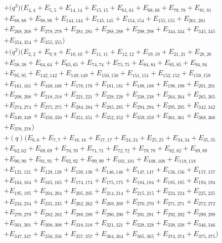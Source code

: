\documentclass[10pt,a4paper]{amsart}
\numberwithin{equation}{section}
\theoremstyle{definition}
\begin{document}
\begin{align*}
&+\bigl(q^3\bigr)(E_{4,4}+E_{5,5}+E_{14,14}+E_{15,15}+E_{61,61}+E_{68,68}+E_{78,78}+E_{81,81}\\
&+E_{88,88}+E_{98,98}+E_{144,144}+E_{145,145}+E_{154,154}+E_{155,155}+E_{261,261}\\
&+E_{268,268}+E_{278,278}+E_{281,281}+E_{288,288}+E_{298,298}+E_{344,344}+E_{345,345}\\
&+E_{354,354}+E_{355,355})\\
&+\bigl(q^2\bigr)(E_{2,2}+E_{9,9}+E_{10,10}+E_{11,11}+E_{12,12}+E_{19,19}+E_{21,21}+E_{28,28}\\
&+E_{38,38}+E_{64,64}+E_{65,65}+E_{74,74}+E_{75,75}+E_{84,84}+E_{85,85}+E_{94,94}\\
&+E_{95,95}+E_{142,142}+E_{149,149}+E_{150,150}+E_{151,151}+E_{152,152}+E_{159,159}\\
&+E_{161,161}+E_{168,168}+E_{178,178}+E_{181,181}+E_{188,188}+E_{198,198}+E_{201,201}\\
&+E_{208,208}+E_{218,218}+E_{221,221}+E_{228,228}+E_{238,238}+E_{264,264}+E_{265,265}\\
&+E_{274,274}+E_{275,275}+E_{284,284}+E_{285,285}+E_{294,294}+E_{295,295}+E_{342,342}\\
&+E_{349,349}+E_{350,350}+E_{351,351}+E_{352,352}+E_{359,359}+E_{361,361}+E_{368,368}\\
&+E_{378,378})\\
&+(q)(E_{6,6}+E_{7,7}+E_{16,16}+E_{17,17}+E_{24,24}+E_{25,25}+E_{34,34}+E_{35,35}\\
&+E_{62,62}+E_{69,69}+E_{70,70}+E_{71,71}+E_{72,72}+E_{79,79}+E_{82,82}+E_{89,89}\\
&+E_{90,90}+E_{91,91}+E_{92,92}+E_{99,99}+E_{101,101}+E_{108,108}+E_{118,118}\\
&+E_{121,121}+E_{128,128}+E_{138,138}+E_{146,146}+E_{147,147}+E_{156,156}+E_{157,157}\\
&+E_{164,164}+E_{165,165}+E_{174,174}+E_{175,175}+E_{184,184}+E_{185,185}+E_{194,194}\\
&+E_{195,195}+E_{204,204}+E_{205,205}+E_{214,214}+E_{215,215}+E_{224,224}+E_{225,225}\\
&+E_{234,234}+E_{235,235}+E_{262,262}+E_{269,269}+E_{270,270}+E_{271,271}+E_{272,272}\\
&+E_{279,279}+E_{282,282}+E_{289,289}+E_{290,290}+E_{291,291}+E_{292,292}+E_{299,299}\\
&+E_{301,301}+E_{308,308}+E_{318,318}+E_{321,321}+E_{328,328}+E_{338,338}+E_{346,346}\\
&+E_{347,347}+E_{356,356}+E_{357,357}+E_{364,364}+E_{365,365}+E_{374,374}+E_{375,375})\\

\end{align*}
\end{document}
